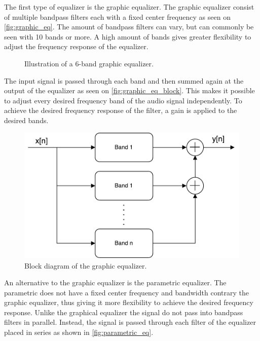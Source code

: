 The first type of equalizer is the graphic equalizer. The graphic equalizer consist of multiple bandpass filters each with a fixed center frequency as seen on \autoref{fig:graphic_eq}. The amount of bandpass filters can vary, but can commonly be seen with 10 bands or more. A high amount of bands gives greater flexibility to adjust the frequency response of the equalizer.

\begin{figure}[H]
\centering
{}

\caption{Illustration of a 6-band graphic equalizer.}
\label{fig:graphic_eq}
\end{figure}

The input signal is passed through each band and then summed again at the output of the equalizer as seen on \autoref{fig:graphic_eq_block}. This makes it possible to adjust every desired frequency band of the audio signal independently. To achieve the desired frequency response of the filter, a gain is applied to the desired bands. %

\begin{figure}[H]
\centering
\includegraphics[width=0.6 \textwidth]{figures/graphic_eq_block.pdf}
\caption{Block diagram of the graphic equalizer.}
\label{fig:graphic_eq_block}
\end{figure}

An alternative to the graphic equalizer is the parametric equalizer. The parametric does not have a fixed center frequency and bandwidth contrary the graphic equalizer, thus giving it more flexibility to achieve the desired frequency response. Unlike the graphical equalizer the signal do not pass into bandpass filters in parallel. Instead, the signal is passed through each filter of the equalizer placed in series as shown in \autoref{fig:parametric_eq}. \\


